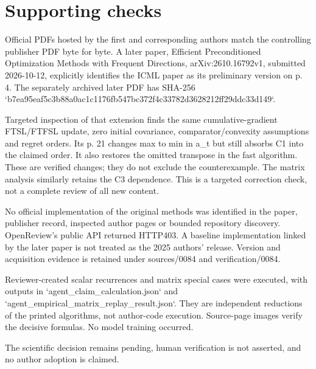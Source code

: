 \documentclass[10pt]{article}
\begin{document}
\section*{Supporting checks}
Official PDFs hosted by the first and corresponding authors match the controlling publisher PDF byte for byte. A later paper, Efficient Preconditioned Optimization Methods with Frequent Directions, arXiv:2610.16792v1, submitted 2026-10-12, explicitly identifies the ICML paper as its preliminary version on p. 4. The separately archived later PDF has SHA-256 `b7ea95eaf5c3b88a0ac1c1176fb547bc372f4c33782d3628212ff29ddc33d149`.\par
Targeted inspection of that extension finds the same cumulative-gradient FTSL/FTFSL update, zero initial covariance, comparator/convexity assumptions and regret orders. Its p. 21 changes max to min in a\_t but still absorbs C1 into the claimed order. It also restores the omitted transpose in the fast algorithm. These are verified changes; they do not exclude the counterexample. The matrix analysis similarly retains the C3 dependence. This is a targeted correction check, not a complete review of all new content.\par
No official implementation of the original methods was identified in the paper, publisher record, inspected author pages or bounded repository discovery. OpenReview’s public API returned HTTP403. A baseline implementation linked by the later paper is not treated as the 2025 authors’ release. Version and acquisition evidence is retained under sources/0084 and verification/0084.\par
Reviewer-created scalar recurrences and matrix special cases were executed, with outputs in `agent\_claim\_calculation.json` and `agent\_empirical\_matrix\_replay\_result.json`. They are independent reductions of the printed algorithms, not author-code execution. Source-page images verify the decisive formulas. No model training occurred.\par
The scientific decision remains pending, human verification is not asserted, and no author adoption is claimed.\par
\end{document}

